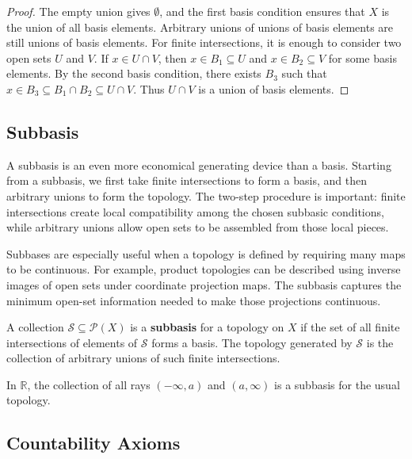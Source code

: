 \begin{proof}
The empty union gives $\emptyset$, and the first basis condition ensures that $X$ is the union of all basis elements. Arbitrary unions of unions of basis elements are still unions of basis elements. For finite intersections, it is enough to consider two open sets $U$ and $V$. If $x\in U\cap V$, then $x\in B_1\subseteq U$ and $x\in B_2\subseteq V$ for some basis elements. By the second basis condition, there exists $B_3$ such that $x\in B_3\subseteq B_1\cap B_2\subseteq U\cap V$. Thus $U\cap V$ is a union of basis elements.
\end{proof}

\subsection{Subbasis}


A subbasis is an even more economical generating device than a basis. Starting from a subbasis, we first take finite intersections to form a basis, and then arbitrary unions to form the topology. The two-step procedure is important: finite intersections create local compatibility among the chosen subbasic conditions, while arbitrary unions allow open sets to be assembled from those local pieces.

Subbases are especially useful when a topology is defined by requiring many maps to be continuous. For example, product topologies can be described using inverse images of open sets under coordinate projection maps. The subbasis captures the minimum open-set information needed to make those projections continuous.

\begin{definition}[Subbasis]
A collection $\mathcal{S}\subseteq\mathcal{P}(X)$ is a \textbf{subbasis} for a topology on $X$ if the set of all finite intersections of elements of $\mathcal{S}$ forms a basis. The topology generated by $\mathcal{S}$ is the collection of arbitrary unions of such finite intersections.
\end{definition}

\begin{example}
In $\mathbb{R}$, the collection of all rays $(-\infty,a)$ and $(a,\infty)$ is a subbasis for the usual topology.
\end{example}

\subsection{Countability Axioms}

